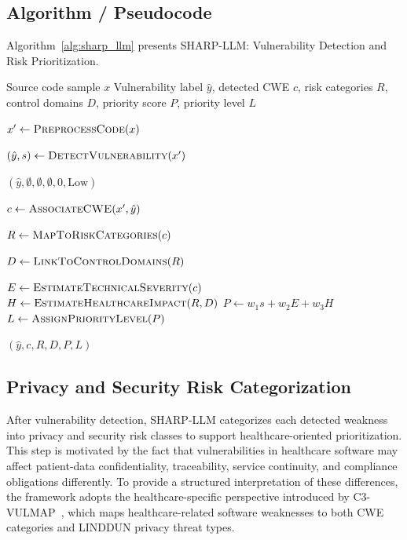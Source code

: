 \documentclass[conference]{IEEEtran}
\begin{document}
\subsection{Algorithm / Pseudocode}
\label{sec:pseudocode}

Algorithm~\ref{alg:sharp_llm} presents SHARP-LLM: Vulnerability Detection and Risk Prioritization.

\begin{algorithm}[t]
\caption{SHARP-LLM: Vulnerability Detection and Risk Prioritization}
\label{alg:sharp_llm}
\begin{algorithmic}[1]
\Require Source code sample $x$
\Ensure Vulnerability label $\hat{y}$, detected CWE $c$, risk categories $R$, control domains $D$, priority score $P$, priority level $L$

\State $x' \gets \textsc{PreprocessCode}(x)$ 

\State $(\hat{y}, s) \gets \textsc{DetectVulnerability}(x')$ 

    \State \Return $(\hat{y}, \emptyset, \emptyset, \emptyset, 0, \text{Low})$
\EndIf

\State $c \gets \textsc{AssociateCWE}(x', \hat{y})$

\State $R \gets \textsc{MapToRiskCategories}(c)$

\State $D \gets \textsc{LinkToControlDomains}(R)$

\State $E \gets \textsc{EstimateTechnicalSeverity}(c)$
\State $H \gets \textsc{EstimateHealthcareImpact}(R, D)$
\State $P \gets w_1 s + w_2 E + w_3 H$
\State $L \gets \textsc{AssignPriorityLevel}(P)$

\State \Return $(\hat{y}, c, R, D, P, L)$
\end{algorithmic}
\end{algorithm}

\subsection{Privacy and Security Risk Categorization}
After vulnerability detection, SHARP-LLM categorizes each detected weakness into privacy and security risk classes to support healthcare-oriented prioritization. This step is motivated by the fact that vulnerabilities in healthcare software may affect patient-data confidentiality, traceability, service continuity, and compliance obligations differently. To provide a structured interpretation of these differences, the framework adopts the healthcare-specific perspective introduced by C3-VULMAP~\cite{ameh2025}, which maps healthcare-related software weaknesses to both CWE categories and LINDDUN privacy threat types.
\end{document}
